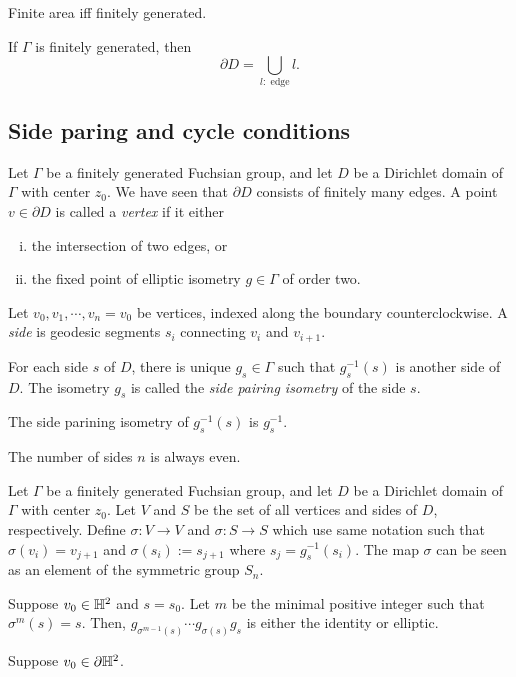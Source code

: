 \documentclass[a4paper]{article}
\begin{document}
\begin{prb}
Finite area iff finitely generated.
\begin{parts}
\item If $\Gamma$ is finitely generated, then
\[\partial D=\bigcup_{l:\text{ edge}}l.\]
\end{parts}
\end{prb}

\subsection{Side paring and cycle conditions}

\begin{prb}
Let $\Gamma$ be a finitely generated Fuchsian group, and let $D$ be a Dirichlet domain of $\Gamma$ with center $z_0$.
We have seen that $\partial D$ consists of finitely many edges.
A point $v\in\partial D$ is called a \emph{vertex} if it either 
\begin{enumerate}[(i)]
\item the intersection of two edges, or
\item the fixed point of elliptic isometry $g\in\Gamma$ of order two.
\end{enumerate}
Let $v_0,v_1,\cdots,v_n=v_0$ be vertices, indexed along the boundary counterclockwise.
A \emph{side} is geodesic segments $s_i$ connecting $v_i$ and $v_{i+1}$.
\begin{parts}
\item For each side $s$ of $D$, there is unique $g_s\in\Gamma$ such that $g_s^{-1}(s)$ is another side of $D$. The isometry $g_s$ is called the \emph{side pairing isometry} of the side $s$.
\item The side parining isometry of $g_s^{-1}(s)$ is $g_s^{-1}$.
\item The number of sides $n$ is always even.
\end{parts}
\end{prb}
\begin{pf}
\end{pf}

\begin{prb}
Let $\Gamma$ be a finitely generated Fuchsian group, and let $D$ be a Dirichlet domain of $\Gamma$ with center $z_0$.
Let $V$ and $S$ be the set of all vertices and sides of $D$, respectively.
Define $\sigma:V\to V$ and $\sigma:S\to S$ which use same notation such that $\sigma(v_i)=v_{j+1}$ and $\sigma(s_i):=s_{j+1}$ where $s_j=g_s^{-1}(s_i)$.
The map $\sigma$ can be seen as an element of the symmetric group $S_n$.
\begin{parts}
\item Suppose $v_0\in\mathbb{H}^2$ and $s=s_0$. Let $m$ be the minimal positive integer such that $\sigma^m(s)=s$. Then, $g_{\sigma^{m-1}(s)}\cdots g_{\sigma(s)}g_s$ is either the identity or elliptic.
\item Suppose $v_0\in\partial\mathbb{H}^2$.
\end{parts}
\end{prb}
\end{document}
